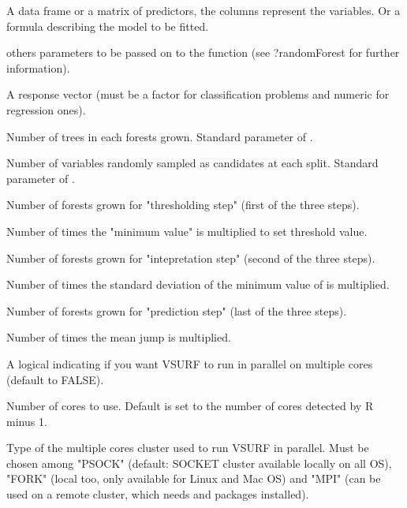 \documentclass[11pt]{article}
\begin{document}
\begin{Arguments}
\begin{ldescription}
\item[\code{x, formula}] A data frame or a matrix of predictors, the columns
represent the variables. Or a formula describing the model to be fitted.

\item[\code{...}] others parameters to be passed on to the 
function (see ?randomForest for further information).

\item[\code{y}] A response vector (must be a factor for classification problems and
numeric for regression ones).

\item[\code{ntree}] Number of trees in each forests grown. Standard parameter of
.

\item[\code{mtry}] Number of variables randomly sampled as candidates at each
split.  Standard parameter of .

\item[\code{nfor.thres}] Number of forests grown for "thresholding step" (first of
the three steps).

\item[\code{nmin}] Number of times the "minimum value" is multiplied to set
threshold value.

\item[\code{nfor.interp}] Number of forests grown for "intepretation step" (second
of the three steps).

\item[\code{nsd}] Number of times the standard deviation of the minimum value of
 is multiplied.

\item[\code{nfor.pred}] Number of forests grown for "prediction step" (last of the
three steps).

\item[\code{nmj}] Number of times the mean jump is multiplied.

\item[\code{parallel}] A logical indicating if you want VSURF to run in parallel on
multiple cores (default to FALSE).

\item[\code{ncores}] Number of cores to use. Default is set to the number of cores
detected by R minus 1.

\item[\code{clusterType}] Type of the multiple cores cluster used to run VSURF in
parallel. Must be chosen among "PSOCK" (default: SOCKET cluster available
locally on all OS), "FORK" (local too, only available for Linux and Mac OS)
and "MPI" (can be used on a remote cluster, which needs  and
 packages installed).


\end{ldescription}
\end{Arguments}
\end{document}
